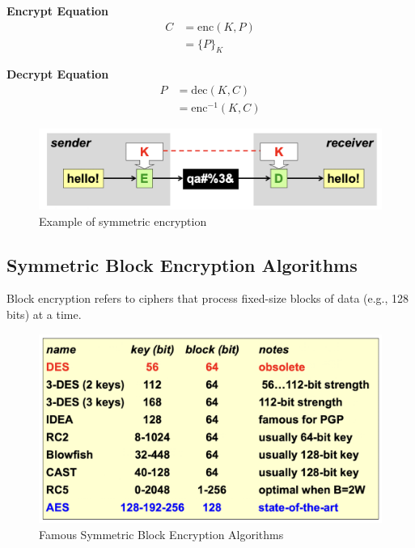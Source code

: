 \begin{multicols}{2}

    \textbf{Encrypt Equation}
\begin{equation*}
    \begin{aligned}
        C &= \text{enc}(K, P) \\
          &= \{ P \}_K
    \end{aligned}
\end{equation*}

\hfill

\textbf{Decrypt Equation}
\begin{equation*}
    \begin{aligned}
        P &= \text{dec}(K, C) \\
          &= \text{enc}^{-1}(K, C)
    \end{aligned}
\end{equation*}
    \columnbreak
    
    \begin{figure}[H]
        \centering
        \includegraphics[width=\linewidth]{Images/Cryptography/symmCrypto.png}
        \caption{Example of symmetric encryption}
    \end{figure}
\end{multicols}


\subsection{Symmetric Block Encryption Algorithms}
Block encryption refers to ciphers that process fixed-size blocks of data (e.g., 128 bits) at a time.

\begin{figure}[H]
    \centering
    \includegraphics[width=0.5\linewidth]{Images/Cryptography/blockSymm.png}
    \caption{Famous Symmetric Block Encryption Algorithms}
\end{figure}



